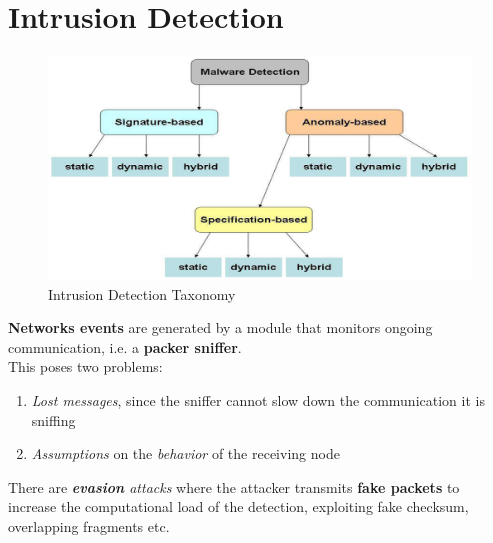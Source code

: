 \chapter{Intrusion Detection}
\begin{figure}[htbp]
   \centering
   \includegraphics{images/IntrusionDetection_schema.png}
   \caption{Intrusion Detection Taxonomy}
   \label{fig:IntrusionDetection_taxonomy}
\end{figure}

      
\textbf{Networks events} are generated by a module that monitors ongoing communication, i.e. a \textbf{packer sniffer}.\\
This poses two problems:
\begin{enumerate}
   \item \textit{Lost messages}, since the sniffer cannot slow down the communication it is sniffing
   \item \textit{Assumptions} on the \textit{behavior} of the receiving node
\end{enumerate}
There are \textit{\textbf{evasion} attacks} where the attacker transmits \textbf{fake packets} to increase the computational load of the detection,
exploiting fake checksum, overlapping fragments etc.

